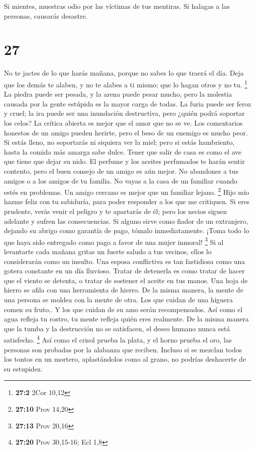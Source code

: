  Si mientes, muestras odio por las víctimas de tus
mentiras. Si halagas a las personas, causarás desastre.

\hypertarget{section-26}{%
\section{27}\label{section-26}}

 No te jactes de lo que harás mañana, porque no sabes lo que
traerá el día.  Deja que los demás te alaben, y no te alabes
a ti mismo; que lo hagan otros y no tu. \footnote{\textbf{27:2} 2Cor
  10,12}  La piedra puede ser pesada, y la arena puede pesar
mucho, pero la molestia causada por la gente estúpida es la mayor carga
de todas.  La furia puede ser feroz y cruel; la ira puede
ser una inundación destructiva, pero ¿quién podrá soportar los celos?
 La crítica abierta es mejor que el amor que no se ve.
 Los comentarios honestos de un amigo pueden herirte, pero
el beso de un enemigo es mucho peor.  Si estás lleno, no
soportarás ni siquiera ver la miel; pero si estás hambriento, hasta la
comida más amarga sabe dulce.  Tener que salir de casa es
como el ave que tiene que dejar su nido.  El perfume y los
aceites perfumados te harán sentir contento, pero el buen consejo de un
amigo es aún mejor.  No abandones a tus amigos o a los
amigos de tu familia. No vayas a la casa de un familiar cuando estés en
problemas. Un amigo cercano es mejor que un familiar lejano. \footnote{\textbf{27:10}
  Prov 14,20}  Hijo mío hazme feliz con tu sabiduría, para
poder responder a los que me critiquen.  Si eres prudente,
verás venir el peligro y te apartarás de él; pero los necios siguen
adelante y sufren las consecuencias.  Si alguno sirve como
fiador de un extranjero, dejando su abrigo como garantía de pago, tómalo
inmediatamente. ¡Toma todo lo que haya sido entregado como pago a favor
de una mujer inmoral! \footnote{\textbf{27:13} Prov 20,16} 
Si al levantarte cada mañana gritas un fuerte saludo a tus vecinos,
ellos lo considerarán como un insulto.  Una esposa
conflictiva es tan fastidiosa como una gotera constante en un día
lluvioso.  Tratar de detenerla es como tratar de hacer que
el viento se detenta, o tratar de sostener el aceite en tus manos.
 Una hoja de hierro se afila con una herramienta de hierro.
De la misma manera, la mente de una persona se moldea con la mente de
otra.  Los que cuidan de una higuera comen su fruto,. Y los
que cuidan de su amo serán recompensados.  Así como el agua
refleja tu rostro, tu mente refleja quién eres realmente. 
De la misma manera que la tumba y la destrucción no se satisfacen, el
deseo humano nunca está satisfecho. \footnote{\textbf{27:20} Prov
  30,15-16; Ecl 1,8}  Así como el crisol prueba la plata, y
el horno prueba el oro, las personas son probadas por la alabanza que
reciben.  Incluso si se mezclan todos los tontos en un
mortero, aplastándolos como al grano, no podrías deshacerte de su
estupidez.

